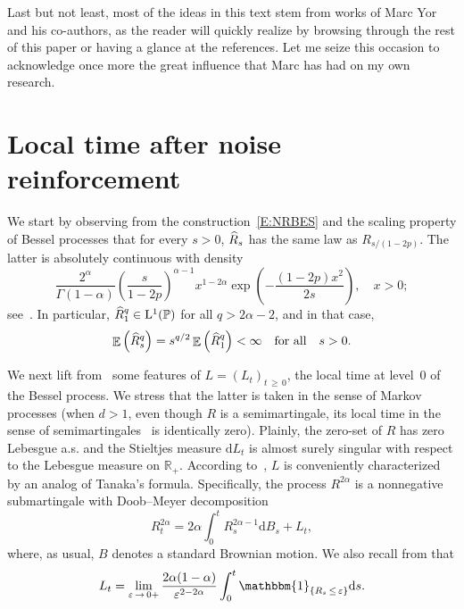 \documentclass[10pt]{amsart}
\theoremstyle{definition}\newtheorem{defi}[theo]{Definition}\newtheorem{rema}[theo]{Remark}\newtheorem{exam}[theo]{Example}\newtheorem{exem}[theo]{Example}\newtheorem{nota}[theo]{Notation}
\newcommand{\ind}[1]{\mathbbm{1}_{\left\{#1\right\}}}
\renewcommand{\hat}[1]{\widehat{#1}}
\newcommand{\dd}{\mathrm{d}}
\newcommand{\rmL}{\mathrm{L}}
\DeclareMathOperator{\E}{\mathbb{E}}
\renewcommand{\P}{\mathbb{P}}
\newcommand{\R}{\mathbb{R}}
\let\oldhat\hat
\renewcommand*{\hat}[1]{\mathchoice{\widehat{#1}}{\widehat{#1}}{\oldhat{#1}}{\oldhat{#1}}}
\begin{document}
Last but not least, most of the ideas in this text stem from works of Marc Yor and his co-authors, as the reader will quickly realize by browsing through the rest of this paper or having a glance at the references. Let me seize this occasion to acknowledge once more the great influence that Marc has had on my own research.


\section{Local time after noise reinforcement}\label{sec:RLT}
We start by observing from the construction~\eqref{E:NRBES} and the scaling property of Bessel processes that for every $s> 0$, $\hat R_s$ has the same law as $R_{s/(1-2p)}$. The latter is absolutely continuous with density
\begin{equation}\label{E:Besdens}
\frac{2^{\alpha}}{ \Gamma(1-\alpha)}\left(\frac{s}{1-2p}\right)^{\alpha-1} x^{1-2\alpha} \exp\left (-\frac{(1-2p)x^2}{2s}\right), \quad x>0;
\end{equation}
see~\cite[p.~446]{RY}. In particular, $\hat R_1^q\in \rmL^1(\P)$ for all $q>2\alpha-2$, and in that case,
\begin{equation}\label{E:momBes}
\E\left(\hat R_s^q\right)=s^{q/2} \E\left(\hat R_1^q\right)<\infty \quad \text{for all}\quad s> 0.
\end{equation}


We next lift from~\cite{DRVY} some features of ${L}=({L}_t)_{t\,\geq\,0}$, the local time at level~$0$ of the Bessel process. We stress that the latter is taken in the sense of Markov processes (when $d>1$, even though $R$ is a semimartingale, its local time in the sense of semimartingales~\cite[Chapter~VI]{RY} is identically zero). Plainly, the zero-set of $R$ has zero Lebesgue a.s. and the Stieltjes measure $\dd {L}_t$ is almost surely singular with respect to the Lebesgue measure on $\R_+$. According to~\cite[Theorem~2.1]{DRVY}, ${L}$ is conveniently characterized by an analog of Tanaka's formula. Specifically, the process $R^{2 \alpha}$ is a nonnegative submartingale with Doob--Meyer decomposition
\begin{equation}\label{E:Tanaka}
R^{2 \alpha}_t = 2\alpha \int_0^t R^{2\alpha-1}_s \dd B_s+ {L}_t,
\end{equation}
where, as usual, $B$ denotes a standard Brownian motion. We also recall from \cite[Propo\-sition~3.1]{DRVY} that
\begin{equation}\label{E:TLO}
{L}_t=\lim_{\varepsilon\,\to\,0+} \frac{2\alpha(1-\alpha)}{\varepsilon^{2-2\alpha} } \int_0^t \ind{R_s\,\leq\,\varepsilon} \dd s.
\end{equation}
\end{document}
